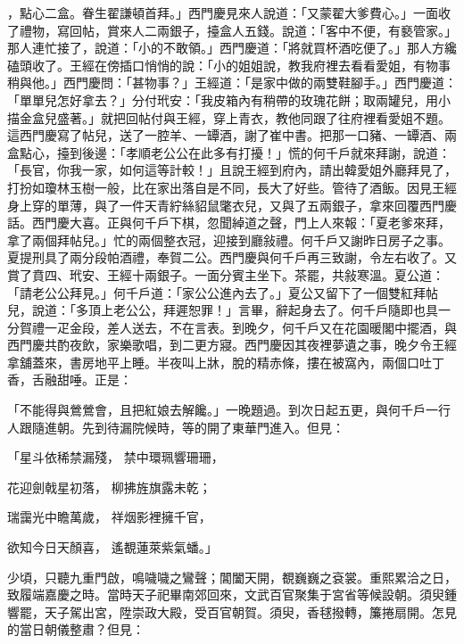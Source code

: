\begin{showcontents}{}
，點心二盒。眷生翟謙頓首拜。」西門慶見來人說道：「又蒙翟大爹費心。」一面收了禮物，寫回帖，賞來人二兩銀子，擡盒人五錢。說道：「客中不便，有褻管家。」那人連忙接了，說道：「小的不敢領。」西門慶道：「將就買杯酒吃便了。」那人方纔磕頭收了。王經在傍插口悄悄的說：「小的姐姐說，教我府裡去看看愛姐，有物事稍與他。」西門慶問：「甚物事？」王經道：「是家中做的兩雙鞋腳手。」西門慶道：「單單兒怎好拿去？」分付玳安：「我皮箱內有稍帶的玫瑰花餅；取兩罐兒，用小描金盒兒盛著。」就把回帖付與王經，穿上青衣，教他同跟了往府裡看愛姐不題。這西門慶寫了帖兒，送了一腔羊、一罈酒，謝了崔中書。把那一口豬、一罈酒、兩盒點心，擡到後邊：「孝順老公公在此多有打擾！」慌的何千戶就來拜謝，說道：「長官，你我一家，如何這等計較！」且說王經到府內，請出韓愛姐外廳拜見了，打扮如瓊林玉樹一般，比在家出落自是不同，長大了好些。管待了酒飯。因見王經身上穿的單薄，與了一件天青紵絲貂鼠氅衣兒，又與了五兩銀子，拿來回覆西門慶話。西門慶大喜。正與何千戶下棋，忽聞綽道之聲，門上人來報：「夏老爹來拜，拿了兩個拜帖兒。」忙的兩個整衣冠，迎接到廳敍禮。何千戶又謝昨日房子之事。夏提刑具了兩分段帕酒禮，奉賀二公。西門慶與何千戶再三致謝，令左右收了。又賞了賁四、玳安、王經十兩銀子。一面分賓主坐下。茶罷，共敍寒溫。夏公道：「請老公公拜見。」何千戶道：「家公公進內去了。」夏公又留下了一個雙紅拜帖兒，說道：「多頂上老公公，拜遲恕罪！」言畢，辭起身去了。何千戶隨即也具一分賀禮一疋金段，差人送去，不在言表。到晚夕，何千戶又在花園暖閣中擺酒，與西門慶共酌夜飲，家樂歌唱，到二更方寢。西門慶因其夜裡夢遺之事，晚夕令王經拿舖蓋來，書房地平上睡。半夜叫上牀，脫的精赤條，摟在被窩內，兩個口吐丁香，舌融甜唾。正是：

「不能得與鶯鶯會，且把紅娘去解饞。」一晚題過。到次日起五更，與何千戶一行人跟隨進朝。先到待漏院候時，等的開了東華門進入。但見：

「星斗依稀禁漏殘，  禁中環珮響珊珊，

花迎劍戟星初落，  柳拂旌旗露未乾；

瑞靄光中瞻萬歲，  祥烟影裡擁千官，

欲知今日天顏喜，  遙覩蓮萊紫氣蟠。」

少頃，只聽九重門啟，鳴噦噦之鸞聲；閶闔天開，覩巍巍之袞裳。重熙累洽之日，致履端嘉慶之時。當時天子祀畢南郊回來，文武百官聚集于宮省等候設朝。須臾鍾響罷，天子駕出宮，陞崇政大殿，受百官朝賀。須臾，香毬撥轉，簾捲扇開。怎見的當日朝儀整肅？但見：


\end{showcontents}
